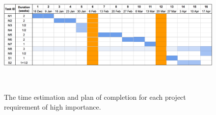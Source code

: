 \documentclass{mprop}
\theoremstyle{definition}
\begin{document}
\begin{figure}
\centering
\caption{The time estimation and plan of completion for each project requirement of high importance.}
\label{fig:estimation}
\includegraphics[width=16cm, height=6cm]{images/estimation.png}
\end{figure}

\clearpage

\newpage


\end{document}
